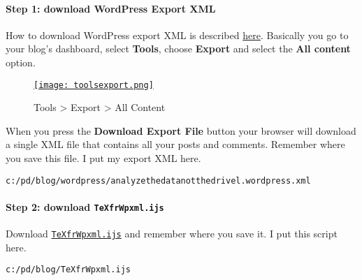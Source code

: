 \paragraph{Step 1: download WordPress Export XML}

How to download WordPress export XML is described
\href{http://en.blog.wordpress.com/2006/06/12/xml-import-export/}{here}.
Basically you go to your blog's dashboard, select \textbf{Tools}, choose
\textbf{Export} and select the \textbf{All content} option.


\captionsetup[figure]{labelformat=empty}
\begin{figure}[htbp]
\centering
\href{http://bakerjd99.files.wordpress.com/2012/02/toolsexport.png}{\texttt{[image: toolsexport.png]}}
\caption{Tools \textgreater{} Export \textgreater{} All  Content}
\label{fig:2518X1}
\end{figure}

When you press the \textbf{Download Export File} button your browser
will download a single XML file that contains all your posts and
comments. Remember where you save this file. I put my export XML here.
\begin{tcolorbox}[breakable, size=fbox, boxrule=1pt, pad at break*=1mm,colback=cellbackground, colframe=cellborder]
\begin{verbatim}
c:/pd/blog/wordpress/analyzethedatanotthedrivel.wordpress.xml
\end{verbatim}
\end{tcolorbox}

\paragraph{Step 2: download \texttt{TeXfrWpxml.ijs}}

Download
\href{http://www.box.com/s/9v5b6ub9cya108c03mr7}{\texttt{TeXfrWpxml.ijs}}
and remember where you save it. I put this script here.

\begin{tcolorbox}[breakable, size=fbox, boxrule=1pt, pad at break*=1mm,colback=cellbackground, colframe=cellborder]
\begin{verbatim}
c:/pd/blog/TeXfrWpxml.ijs
\end{verbatim}
\end{tcolorbox}


